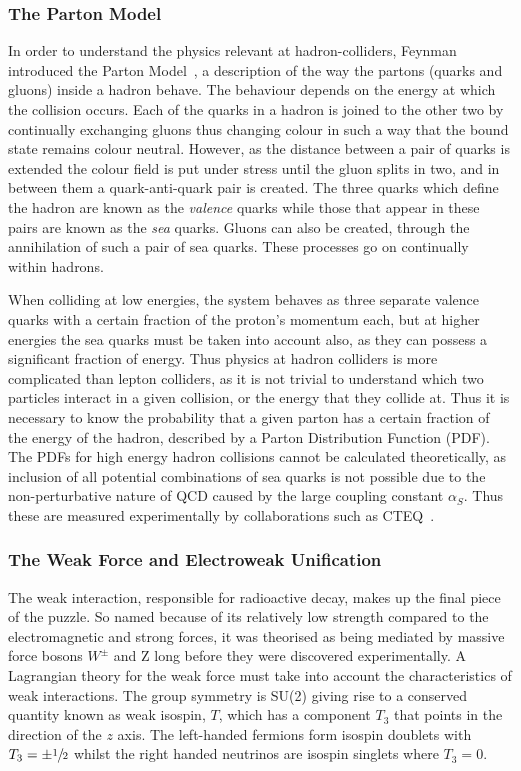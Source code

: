  \subsubsection{The Parton Model}
 
In order to understand the physics relevant at hadron-colliders, Feynman introduced the Parton Model~\cite{partonfeyn}, a description of the way the partons (quarks and gluons) inside a hadron behave. The behaviour depends on the energy at which the collision occurs. Each of the quarks in a hadron is joined to the other two by continually exchanging gluons thus changing colour in such a way that the bound state remains colour neutral. However, as the distance between a pair of quarks is extended the colour field is put under stress until the gluon splits in two, and in between them a quark-anti-quark pair is created. The three quarks which define the hadron are known as the \textit{valence} quarks while those that appear in these pairs are known as the \textit{sea} quarks. Gluons can also be created, through the annihilation of such a pair of sea quarks. These processes go on continually within hadrons. 
 
 When colliding at low energies, the system behaves as three separate valence quarks with a certain fraction of the proton's momentum each, but at higher energies the sea quarks must be taken into account also, as they can possess a significant fraction of energy.  Thus physics at hadron colliders is more complicated than lepton colliders, as it is not trivial to understand which two particles interact in a given collision, or the energy that they collide at. Thus it is necessary to know the probability that a given parton has a certain fraction of the energy of the hadron,  described by a Parton Distribution Function (PDF). The PDFs for high energy hadron collisions cannot be calculated theoretically, as inclusion of all potential combinations of sea quarks is not possible due to the non-perturbative nature of QCD caused by the large coupling constant $\alpha_{S}$. Thus these are measured experimentally by collaborations such as CTEQ~\cite{CTEQ}. 
 


\subsubsection{The Weak Force and Electroweak Unification}

The weak interaction, responsible for radioactive decay, makes up the final piece of the puzzle. So named because of its relatively low strength compared to the electromagnetic and strong forces, it was theorised as being mediated by massive force bosons $W^{\pm}$ and Z long before they were discovered experimentally. A Lagrangian theory for the weak force must take into account the characteristics of weak interactions. The group symmetry is SU(2) giving rise to a conserved quantity known as weak isospin, $T$, which has a component $T_{3}$ that points in the direction of the $z$ axis. The left-handed fermions form isospin doublets with $T_{3} = \pm \sfrac{1}{2}$ whilst the right handed neutrinos are isospin singlets where $T_{3} = 0$.


